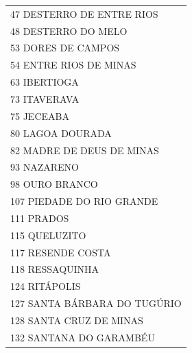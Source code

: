 \documentclass{article}
\begin{document}
\begin{longtable}[c]{m{18cm}}
\multicolumn{1}{l}{ \hspace{2em} 47 DESTERRO DE ENTRE RIOS } \\
\multicolumn{1}{l}{ \hspace{2em} 48 DESTERRO DO MELO } \\
\multicolumn{1}{l}{ \hspace{2em} 53 DORES DE CAMPOS } \\
\multicolumn{1}{l}{ \hspace{2em} 54 ENTRE RIOS DE MINAS } \\
\multicolumn{1}{l}{ \hspace{2em} 63 IBERTIOGA } \\
\multicolumn{1}{l}{ \hspace{2em} 73 ITAVERAVA } \\
\multicolumn{1}{l}{ \hspace{2em} 75 JECEABA } \\
\multicolumn{1}{l}{ \hspace{2em} 80 LAGOA DOURADA } \\
\multicolumn{1}{l}{ \hspace{2em} 82 MADRE DE DEUS DE MINAS } \\
\multicolumn{1}{l}{ \hspace{2em} 93 NAZARENO } \\
\multicolumn{1}{l}{ \hspace{2em} 98 OURO BRANCO } \\
\multicolumn{1}{l}{ \hspace{2em} 107 PIEDADE DO RIO GRANDE } \\
\multicolumn{1}{l}{ \hspace{2em} 111 PRADOS } \\
\multicolumn{1}{l}{ \hspace{2em} 115 QUELUZITO } \\
\multicolumn{1}{l}{ \hspace{2em} 117 RESENDE COSTA } \\
\multicolumn{1}{l}{ \hspace{2em} 118 RESSAQUINHA } \\
\multicolumn{1}{l}{ \hspace{2em} 124 RITÁPOLIS } \\
\multicolumn{1}{l}{ \hspace{2em} 127 SANTA BÁRBARA DO TUGÚRIO } \\
\multicolumn{1}{l}{ \hspace{2em} 128 SANTA CRUZ DE MINAS } \\
\multicolumn{1}{l}{ \hspace{2em} 132 SANTANA DO GARAMBÉU } \\

\end{longtable}
\end{document}
